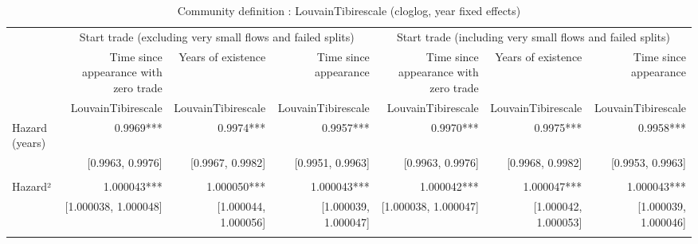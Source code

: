 \begin{table}[!h]
\caption{Community definition : LouvainTibirescale (cloglog, year fixed effects)}
\centering
\begin{tabular}{lllllll}
\cline{1-7}
\multicolumn{1}{c}{} &
  \multicolumn{3}{|c}{Start trade (excluding very small flows and failed splits)} &
  \multicolumn{3}{c}{Start trade (including very small flows and failed splits)} \\
\multicolumn{1}{c}{} &
  \multicolumn{1}{|r}{Time since appearance with zero trade} &
  \multicolumn{1}{r}{Years of existence} &
  \multicolumn{1}{r}{Time since appearance} &
  \multicolumn{1}{r}{Time since appearance with zero trade} &
  \multicolumn{1}{r}{Years of existence} &
  \multicolumn{1}{r}{Time since appearance} \\
\multicolumn{1}{c}{} &
  \multicolumn{1}{|r}{LouvainTibirescale} &
  \multicolumn{1}{r}{LouvainTibirescale} &
  \multicolumn{1}{r}{LouvainTibirescale} &
  \multicolumn{1}{r}{LouvainTibirescale} &
  \multicolumn{1}{r}{LouvainTibirescale} &
  \multicolumn{1}{r}{LouvainTibirescale} \\
\cline{1-7}
\multicolumn{1}{l}{Hazard (years)} &
  \multicolumn{1}{|r}{0.9969***} &
  \multicolumn{1}{r}{0.9974***} &
  \multicolumn{1}{r}{0.9957***} &
  \multicolumn{1}{r}{0.9970***} &
  \multicolumn{1}{r}{0.9975***} &
  \multicolumn{1}{r}{0.9958***} \\
\multicolumn{1}{l}{} &
  \multicolumn{1}{|r}{[0.9963, 0.9976]} &
  \multicolumn{1}{r}{[0.9967, 0.9982]} &
  \multicolumn{1}{r}{[0.9951, 0.9963]} &
  \multicolumn{1}{r}{[0.9963, 0.9976]} &
  \multicolumn{1}{r}{[0.9968, 0.9982]} &
  \multicolumn{1}{r}{[0.9953, 0.9963]} \\
\multicolumn{1}{l}{} &
  \multicolumn{1}{|r}{} &
  \multicolumn{1}{r}{} &
  \multicolumn{1}{r}{} &
  \multicolumn{1}{r}{} &
  \multicolumn{1}{r}{} &
  \multicolumn{1}{r}{} \\
\multicolumn{1}{l}{Hazard²} &
  \multicolumn{1}{|r}{1.000043***} &
  \multicolumn{1}{r}{1.000050***} &
  \multicolumn{1}{r}{1.000043***} &
  \multicolumn{1}{r}{1.000042***} &
  \multicolumn{1}{r}{1.000047***} &
  \multicolumn{1}{r}{1.000043***} \\
\multicolumn{1}{l}{} &
  \multicolumn{1}{|r}{[1.000038, 1.000048]} &
  \multicolumn{1}{r}{[1.000044, 1.000056]} &
  \multicolumn{1}{r}{[1.000039, 1.000047]} &
  \multicolumn{1}{r}{[1.000038, 1.000047]} &
  \multicolumn{1}{r}{[1.000042, 1.000053]} &
  \multicolumn{1}{r}{[1.000039, 1.000046]} \\
\multicolumn{1}{l}{} &

\end{tabular}
\end{table}
